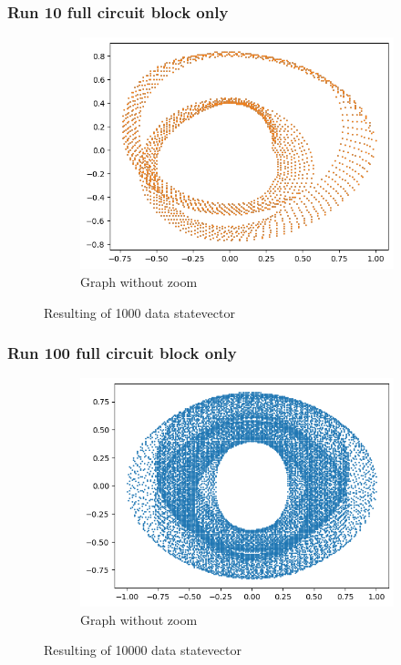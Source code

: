 \subsubsection{Run 10 full circuit block only}
\begin{figure}[ht!]
        \centering
        \begin{subfigure}[c]{0.5\textwidth}
                \includegraphics[width=\textwidth]{Chapitre1/Figures/unlimit_band_10.png}
                \caption{Graph without zoom}
        \end{subfigure}%
        \caption{Resulting of 1000 data statevector}
\end{figure}

\subsubsection{Run 100 full circuit block only}

\begin{figure}[ht!]
        \centering
        \begin{subfigure}[c]{0.5\textwidth}
                \includegraphics[width=\textwidth]{Chapitre1/Figures/unlimit_band_100.png}
                \caption{Graph without zoom}
        \end{subfigure}%
        \caption{Resulting of 10000 data statevector}
\end{figure}




